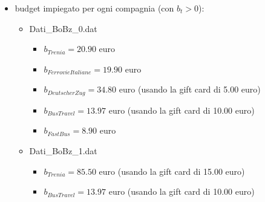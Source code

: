 \documentclass[main.tex]{subfiles}
\begin{document}
\begin{itemize}
\begin{itemize}
    \end{itemize}
    \item budget impiegato per ogni compagnia (con $b_t > 0$):
    \begin{itemize}
        \item Dati\_BoBz\_0.dat
        \begin{itemize}
            \item $b_{Trenia} = 20.90$ euro
            \item $b_{FerrovieItaliane} = 19.90$ euro
            \item $b_{DeutscherZug} = 34.80$ euro (usando la gift card di 5.00 euro)
            \item $b_{BusTravel} = 13.97$ euro (usando la gift card di 10.00 euro)
            \item $b_{FastBus} = 8.90$ euro
        \end{itemize}
        \item Dati\_BoBz\_1.dat
        \begin{itemize}
            \item $b_{Trenia} = 85.50$ euro (usando la gift card di 15.00 euro)
            \item $b_{BusTravel} = 13.97$ euro (usando la gift card di 10.00 euro)
        \end{itemize}
    \end{itemize}
\end{itemize}
\end{document}
